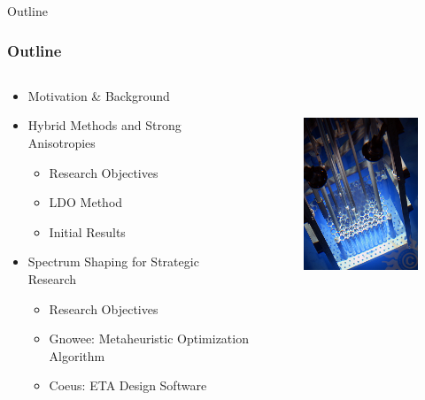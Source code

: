 \documentclass[xcolor=x11names,compress,handout]{beamer}
\renewcommand{\(}{\begin{columns}}
\renewcommand{\)}{\end{columns}}
\newcommand{\<}[1]{\begin{column}{#1}}
\renewcommand{\>}{\end{column}}
\begin{document}
\begin{frame}[fragile]{Outline}
  \frametitle{Outline}

\begin{columns}
  \begin{column}{0.5\textwidth}
    \begin{itemize}
    \item Motivation \& Background
    \vspace*{.5em}
    \item Hybrid Methods and Strong Anisotropies
        \begin{itemize}
        \item Research Objectives
	    \item LDO Method
	    \item Initial Results
        \end{itemize}
        
   \vspace*{.5em}
   \item Spectrum Shaping for Strategic Research
        \begin{itemize}
        \item Research Objectives
	\item Gnowee: Metaheuristic Optimization Algorithm
	\item Coeus: ETA Design Software
        \end{itemize}	
  \end{itemize}
  \end{column}
  \begin{column}{0.5\textwidth}
  	\begin{figure}
  	\begin{center}
  		\includegraphics[height=2.5in,clip]{../figs/psu-reactor}
	\end{center}
  	\end{figure}
  \end{column}
\end{columns}

\end{frame}
\end{document}
